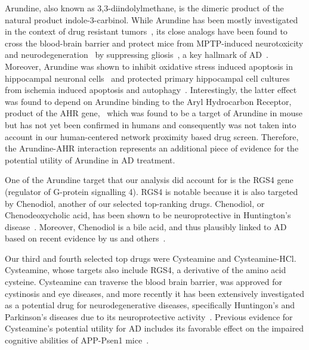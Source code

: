 \documentclass[letterpaper]{article}
\begin{document}
Arundine, also known as 3,3-diindolylmethane, is the dimeric product of the
natural product indole-3-carbinol.  While Arundine has been mostly
investigated in the context of drug resistant tumors~\citep{Biersack2020}, its
close analogs have been found to cross the blood-brain barrier and protect
mice from MPTP-induced neurotoxicity and
neurodegeneration~\citep{DeMiranda2013} by suppressing
gliosis~\citep{DeMiranda2014}, a key hallmark of AD~\citep{DeStrooper2016}.
Moreover, Arundine was shown to inhibit oxidative stress induced apoptosis in
hippocampal neuronal cells~\citep{Lee2019} and protected primary hippocampal
cell cultures from ischemia induced apoptosis and
autophagy~\citep{Rzemieniec2019}.  Interestingly, the latter effect was found
to depend on Arundine binding to the Aryl Hydrocarbon Receptor, product of the
AHR gene,~\citep{Rzemieniec2019} which was found to be a target of Arundine in
mouse but has not yet been confirmed in humans and consequently was not taken
into account in our human-centered network proximity based drug screen.
Therefore, the Arundine-AHR interaction represents an additional piece of
evidence for the potential utility of Arundine in AD treatment.

One of the Arundine target that our analysis did account for is the RGS4 gene
(regulator of G-protein signalling 4). RGS4 is notable
because it is also targeted by Chenodiol, another of our selected top-ranking
drugs.  Chenodiol, or Chenodeoxycholic acid, has been shown to be
neuroprotective in Huntington's disease~\citep{Keene2002}.  Moreover,
Chenodiol is a bile acid, and thus plausibly linked to
AD based on recent evidence by us and others~\citep{Varma2021,Baloni2020}.

Our third and fourth selected top drugs were Cysteamine and Cysteamine-HCl.
Cysteamine, whose targets also include RGS4, a derivative of the amino acid
cysteine.  Cysteamine can traverse the blood brain barrier, was approved for
cystinosis and eye diseases, and more recently it has been extensively
investigated as a potential drug for neurodegenerative diseases, specifically
Huntingon's and Parkinson's diseases due to its neuroprotective
activity~\citep{Besouw2013,Paul2019}.  Previous evidence for Cysteamine's
potential utility for AD includes its favorable effect on the impaired
cognitive abilities of APP-Psen1 mice~\citep{Cicchetti2019}.
\end{document}
